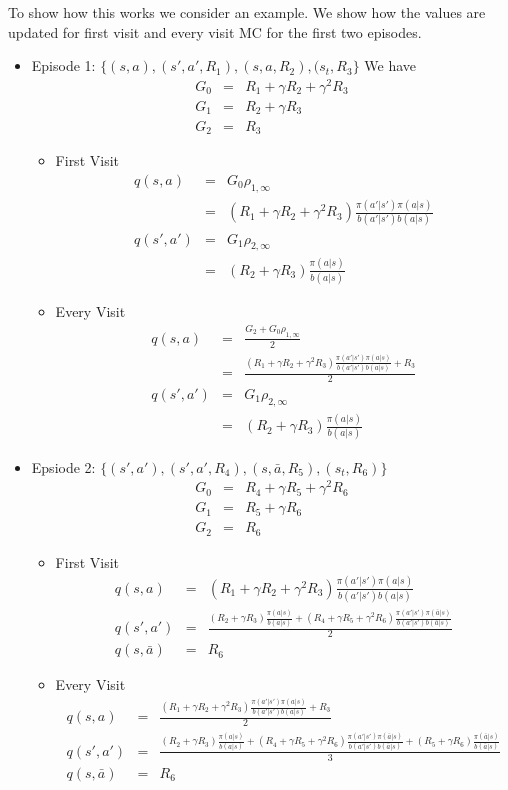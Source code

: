 \documentclass[11pt,a4paper]{article}
\newcommand\bea{\begin{eqnarray}}
\newcommand\eea{\end{eqnarray}}
\newcommand{\nn}{\nonumber \\}
\begin{document}
To show how this works we consider an example. We show how the values are updated for first visit and every visit MC for the first two episodes. 
\begin{itemize}
\item Episode 1: $\{(s,a),(s',a',R_1),(s,a,R_2),(s_t,R_3\}$ 
We have
\bea
G_0 &=& R_1 + \gamma R_2 + \gamma^2 R_3 \\
G_1 &=&  R_2 + \gamma R_3 \\
G_2 &=& R_3 
\eea

\begin{itemize}
\item First Visit
\bea
q(s,a) &=& G_0 \rho_{1,\infty} \nn
&=&  (R_1 + \gamma R_2+\gamma^2 R_3) \frac{\pi(a'|s') \pi(a|s)}{b(a'|s') b(a|s)} \\
q(s',a') &=& G_1 \rho_{2,\infty}  \nn
&=& (R_2 + \gamma R_3) \frac{\pi(a|s)}{b(a|s)}
\eea
\item Every Visit
\bea
q(s,a) &=& \frac{G_2 + G_0 \rho_{1,\infty}}{2} \nn
&=&  \frac{(R_1 + \gamma R_2+\gamma^2 R_3) \frac{\pi(a'|s') \pi(a|s)}{b(a'|s') b(a|s)}+R_3}{2} \\
q(s',a') &=& G_1 \rho_{2,\infty}  \nn
&=& (R_2 + \gamma R_3) \frac{\pi(a|s)}{b(a|s)}
\eea
\end{itemize}
\item  Epsiode 2: $\{(s',a'),(s',a',R_4),(s,\bar a,R_5),(s_t,R_6)\}$
\bea
G_0 &=& R_4 + \gamma R_5 + \gamma^2 R_6 \\
G_1 &=& R_5 + \gamma R_6 \\
G_2 &=& R_6
\eea
\begin{itemize}
\item First Visit
\bea
q(s,a) &=& (R_1 + \gamma R_2+\gamma^2 R_3) \frac{\pi(a'|s') \pi(a|s)}{b(a'|s') b(a|s)} \\
q(s',a') &=& \frac{(R_2 + \gamma R_3) \frac{\pi(a|s)}{b(a|s)} + (R_4 + \gamma R_5 + \gamma^2 R_6) \frac{\pi(a'|s') \pi(\bar a|s)}{b(a'|s') b(\bar a|s)}}{2} \\
q(s,\bar a) &=& R_6
\eea
\item Every Visit
\bea
q(s,a) &=& \frac{(R_1 + \gamma R_2+\gamma^2 R_3) \frac{\pi(a'|s') \pi(a|s)}{b(a'|s') b(a|s)}+R_3}{2} \\
q(s',a') &=& \frac{(R_2 + \gamma R_3) \frac{\pi(a|s)}{b(a|s)} + (R_4 + \gamma R_5 + \gamma^2 R_6) \frac{\pi(a'|s') \pi(\bar a|s)}{b(a'|s') b(\bar a|s)} + (R_5+ \gamma R_6)  \frac{ \pi(\bar a|s)}{ b(\bar a|s)}}{3} \\
q(s,\bar a) &=& R_6
\eea
\end{itemize}
\end{itemize}
\end{document}
